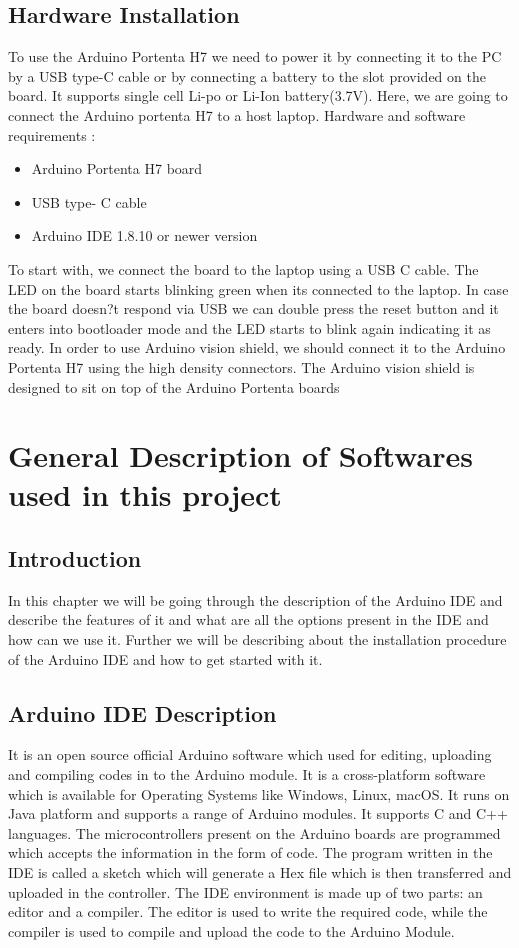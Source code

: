 \section{Hardware Installation}
To use the Arduino Portenta H7 we need to power it by connecting it to the PC by a USB type-C cable or by connecting a battery to the slot provided on the board. It supports single cell Li-po or Li-Ion battery(3.7V).  Here, we are going to connect the Arduino portenta H7 to a host laptop.
Hardware and software requirements :
\begin{itemize}
	\item	Arduino Portenta H7 board
	\item	USB type- C cable
	\item	Arduino IDE 1.8.10 or newer version
\end{itemize}
To start with, we connect the board to the laptop using a USB C cable. The LED on the board starts blinking green when its connected to the laptop. In case the board doesn?t respond via USB we can double press the reset button  and it enters into bootloader mode and the LED starts to blink again indicating it as ready. 
In order to use Arduino vision shield, we should connect it to the Arduino Portenta H7 using the high density connectors. The Arduino vision shield is designed to sit on top of the Arduino Portenta boards

\chapter{General Description of Softwares used in this project}
\section{Introduction}
In this chapter we will be going through the description of the Arduino IDE and describe  the features of it and what are all the options present in the IDE and how can we use it. Further we will be describing about the installation procedure of the Arduino IDE and how to get started with it.
\section{Arduino IDE Description}
It is an open source official Arduino software which used for editing, uploading and compiling codes in to the Arduino module. It is a cross-platform software which is available for Operating Systems like Windows, Linux, macOS. It runs on Java platform and supports a range of Arduino modules. It supports C and C++ languages. The microcontrollers present on the Arduino boards are programmed which accepts the information in the form of code. The program written in the IDE is called a sketch which will generate a Hex file which is then transferred and uploaded in the controller. The IDE environment is made up of two parts: an editor and a compiler. The editor is used to write the required code, while the compiler is used to compile and upload the code to the Arduino Module.\cite{Fezari:2018}


